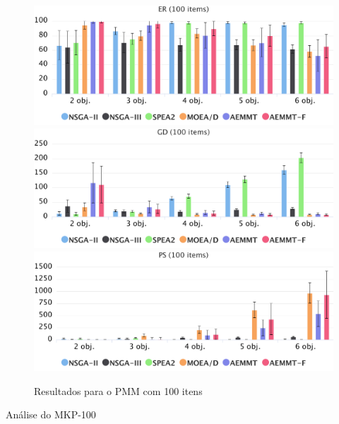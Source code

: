 \begin{figure}[!htbp]
	\caption{Resultados para o PMM com 100 itens}
	\label{fig_exp1_mkp_100}
	\includegraphics[width=1\textwidth]{cap_experimentos/figs/er-mkp-100}
	\includegraphics[width=1\textwidth]{cap_experimentos/figs/gd-mkp-100}
	\includegraphics[width=1\textwidth]{cap_experimentos/figs/ps-mkp-100}
\end{figure}

Análise do MKP-100

